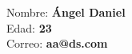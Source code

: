 \documentclass{article}
\begin{document}
Nombre: \textbf{Ángel Daniel} \\
Edad: \textbf{23} \\
Correo: \textbf{aa@ds.com}
\end{document}
